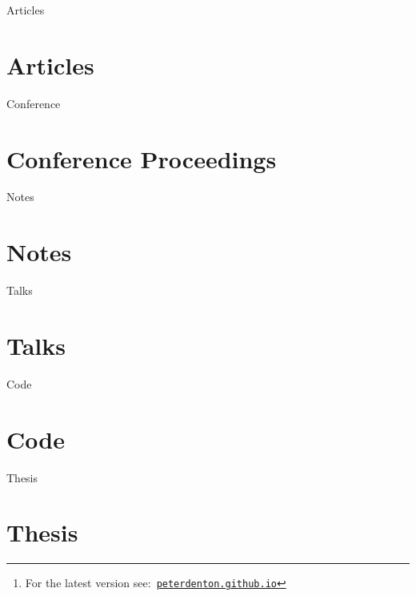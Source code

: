 \documentclass[12pt]{article}
\title{\myTitle}
\author{\myName}
\date{\small Updated: \today\footnote{For the latest version see:\ \href{http://peterdenton.github.io}{\tt peterdenton.github.io}}}
\newcommand\myBib[2]{
\begin{btSect}{#2}
\section*{#1}
\btPrintAll
\end{btSect}}
\begin{document}
\makeatletter
\let\@fnsymbol\@arabic
\makeatother

\maketitle



\myBib{Articles}{Articles}
\myBib{Conference Proceedings}{Conference}
\myBib{Notes}{Notes}
\myBib{Talks}{Talks}
\myBib{Code}{Code}
\myBib{Thesis}{Thesis}
\end{document}
